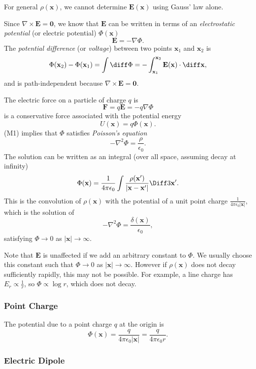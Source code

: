\documentclass[12pt]{article}
\begin{document}
For general $\rho(\mathbf{x})$, we cannot determine $\mathbf{E}(\mathbf{x})$ using Gauss' law alone.

Since $\nabla \times \mathbf{E} = \mathbf{0}$, we know that $\mathbf{E}$ can be written in terms of an \emph{electrostatic potential} (or electric potential) $\Phi(\mathbf{x})$
\[
\mathbf{E} = - \nabla \Phi
.\]
The \emph{potential difference} (or \emph{voltage}) between two points $\mathbf{x}_1$ and $\mathbf{x}_2$ is
\[
\Phi(\mathbf{x}_2) - \Phi(\mathbf{x}_1) = \int \diff \Phi = - \int_{\mathbf{x}_1}^{\mathbf{x}_2} \mathbf{E}(\mathbf{x}) \cdot \diff \mathbf{x}
,\]
and is path-independent because $\nabla \times \mathbf{E} = \mathbf{0}$.

The electric force on a particle of charge $q$ is
\[
\mathbf{F} = q \mathbf{E} = - q \nabla \Phi
\]
is a conservative force associated with the potential energy
\[
U(\mathbf{x}) = q \Phi(\mathbf{x})
.\]
(M1) implies that $\Phi$ satisfies \emph{Poisson's equation}
\[
- \nabla^2 \Phi = \frac{\rho}{\epsilon_0}
.\]
The solution can be written as an integral (over all space, assuming decay at infinity)
\[
\Phi(\mathbf{x}) = \frac{1}{4 \pi \epsilon_0} \int \frac{\rho(\mathbf{x}')}{|\mathbf{x} - \mathbf{x}'|} \Diff3 \mathbf{x}'
.\]
This is the convolution of $\rho(\mathbf{x})$ with the potential of a unit point charge $\frac{1}{4 \pi \epsilon_0 |\mathbf{x}|}$, which is the solution of
\[
- \nabla^2 \Phi = \frac{\delta (\mathbf{x})}{\epsilon_0}
,\]
satisfying $\Phi \to 0$ as $|\mathbf{x}| \to \infty$.

Note that $\mathbf{E}$ is unaffected if we add an arbitrary constant to $\Phi$. We usually choose this constant such that $\Phi \to 0$ as $|\mathbf{x}| \to \infty$. However if $\rho(\mathbf{x})$ does not decay sufficiently rapidly, this may not be possible. For example, a line charge has $E_r \propto \frac{1}{r}$, so $\Phi \propto \log r$, which does not decay.

\subsubsection{Point Charge}
\label{subsub:point_charge}

The potential due to a point charge $q$ at the origin is
\[
\Phi(\mathbf{x}) = \frac{q}{4 \pi \epsilon_0 |\mathbf{x}|} = \frac{q}{4 \pi \epsilon_0 r}
.\]

\subsubsection{Electric Dipole}
\label{subsub:electric_dipole}
\end{document}
